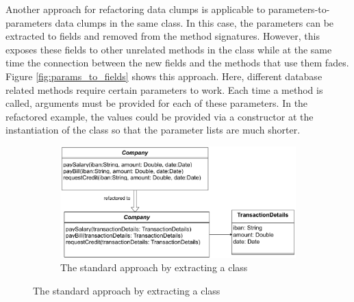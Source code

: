 Another approach for refactoring data clumps is applicable to parameters-to-parameters data clumps in the same class. In this case, the parameters can be extracted to fields and removed from the method signatures. However, this exposes these fields to other unrelated methods in the class while at the same time the connection between the new fields and the methods that use them fades. Figure \ref{fig:params_to_fields} shows this approach. Here, different database related methods require certain parameters to work. Each time a method is called,  arguments must be provided for each of these parameters. In the refactored example, the values could be provided via a constructor at the instantiation of the class so that the parameter lists are much shorter. 




\begin{figure}
\centering
    \begin{subfigure}[t]{0.8\columnwidth}
    \includegraphics[width=1\columnwidth]{figures/chapter2/dataClump/refactor_simple_case.pdf}
    \caption{The standard approach by extracting a class}
    \label{fig:company_bill_tax}
    \end{subfigure}
       

\end{figure}
